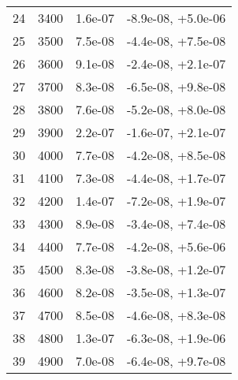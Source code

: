 \begin{table}
\begin{adjustbox}{width=1\textwidth/2}
\begin{tabular}{|c|c|c|c|}
\cline{1-4}
24 & 3400 & 1.6e-07 & -8.9e-08, +5.0e-06 \\
\cline{1-4}
25 & 3500 & 7.5e-08 & -4.4e-08, +7.5e-08 \\
\cline{1-4}
26 & 3600 & 9.1e-08 & -2.4e-08, +2.1e-07 \\
\cline{1-4}
27 & 3700 & 8.3e-08 & -6.5e-08, +9.8e-08 \\
\cline{1-4}
28 & 3800 & 7.6e-08 & -5.2e-08, +8.0e-08 \\
\cline{1-4}
29 & 3900 & 2.2e-07 & -1.6e-07, +2.1e-07 \\
\cline{1-4}
30 & 4000 & 7.7e-08 & -4.2e-08, +8.5e-08 \\
\cline{1-4}
31 & 4100 & 7.3e-08 & -4.4e-08, +1.7e-07 \\
\cline{1-4}
32 & 4200 & 1.4e-07 & -7.2e-08, +1.9e-07 \\
\cline{1-4}
33 & 4300 & 8.9e-08 & -3.4e-08, +7.4e-08 \\
\cline{1-4}
34 & 4400 & 7.7e-08 & -4.2e-08, +5.6e-06 \\
\cline{1-4}
35 & 4500 & 8.3e-08 & -3.8e-08, +1.2e-07 \\
\cline{1-4}
36 & 4600 & 8.2e-08 & -3.5e-08, +1.3e-07 \\
\cline{1-4}
37 & 4700 & 8.5e-08 & -4.6e-08, +8.3e-08 \\
\cline{1-4}
38 & 4800 & 1.3e-07 & -6.3e-08, +1.9e-06 \\
\cline{1-4}
39 & 4900 & 7.0e-08 & -6.4e-08, +9.7e-08 \\
\cline{1-4}
\end{tabular}
\end{adjustbox}
\end{table}

